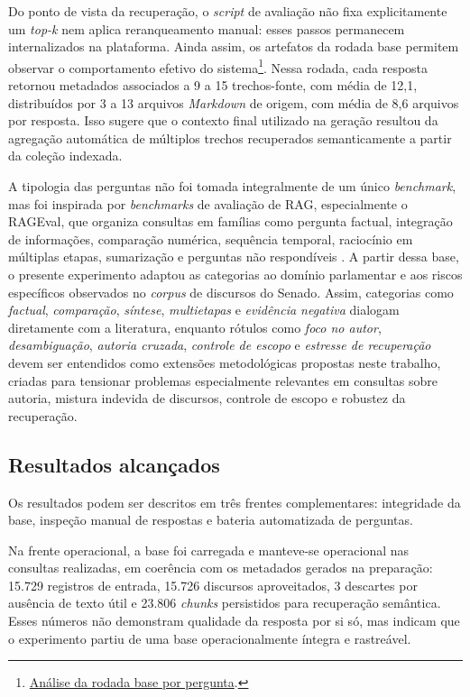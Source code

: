Do ponto de vista da recuperação, o \textit{script} de avaliação não fixa explicitamente um \textit{top-k} nem aplica reranqueamento manual: esses passos permanecem internalizados na plataforma. Ainda assim, os artefatos da rodada base permitem observar o comportamento efetivo do sistema\footnote{\href{https://github.com/fabriciosantana/mcdia/blob/main/05-iag/4-project/eval/results/rag_eval_20260416T172816Z.question_analysis.md}{Análise da rodada base por pergunta}.}. Nessa rodada, cada resposta retornou metadados associados a 9 a 15 trechos-fonte, com média de 12,1, distribuídos por 3 a 13 arquivos \textit{Markdown} de origem, com média de 8,6 arquivos por resposta. Isso sugere que o contexto final utilizado na geração resultou da agregação automática de múltiplos trechos recuperados semanticamente a partir da coleção indexada.

A tipologia das perguntas não foi tomada integralmente de um único \textit{benchmark}, mas foi inspirada por \textit{benchmarks} de avaliação de RAG, especialmente o RAGEval, que organiza consultas em famílias como pergunta factual, integração de informações, comparação numérica, sequência temporal, raciocínio em múltiplas etapas, sumarização e perguntas não respondíveis \parencite{zhuEtAl2025rageval}. A partir dessa base, o presente experimento adaptou as categorias ao domínio parlamentar e aos riscos específicos observados no \textit{corpus} de discursos do Senado. Assim, categorias como \textit{factual}, \textit{comparação}, \textit{síntese}, \textit{multietapas} e \textit{evidência negativa} dialogam diretamente com a literatura, enquanto rótulos como \textit{foco no autor}, \textit{desambiguação}, \textit{autoria cruzada}, \textit{controle de escopo} e \textit{estresse de recuperação} devem ser entendidos como extensões metodológicas propostas neste trabalho, criadas para tensionar problemas especialmente relevantes em consultas sobre autoria, mistura indevida de discursos, controle de escopo e robustez da recuperação.

\subsection{Resultados alcançados}

Os resultados podem ser descritos em três frentes complementares: integridade da base, inspeção manual de respostas e bateria automatizada de perguntas. 

Na frente operacional, a base foi carregada e manteve-se operacional nas consultas realizadas, em coerência com os metadados gerados na preparação: 15.729 registros de entrada, 15.726 discursos aproveitados, 3 descartes por ausência de texto útil e 23.806 \textit{chunks} persistidos para recuperação semântica. Esses números não demonstram qualidade da resposta por si só, mas indicam que o experimento partiu de uma base operacionalmente íntegra e rastreável.

